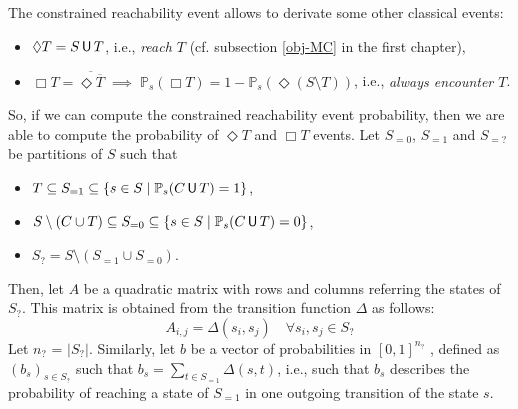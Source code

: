 The constrained reachability event allows to derivate some other classical events:
\begin{itemize}
  \item $\Diamond T = S \,\text{\sffamily U}\, T$, i.e., \textit{reach $T$} (cf. subsection \ref{obj-MC} in the first chapter),
  \item $\Box T =  \overline{\Diamond \overline{T}} \; \implies \; \mathbb{P}_s(\Box T) = 1 - \mathbb{P}_s (\Diamond (S \setminus T))$, i.e., \textit{always encounter $T$}.
\end{itemize}
So, if we can compute the constrained reachability event probability, then we are able to compute the probability of $\Diamond T$ and $\Box T$ events.
Let $S_{=0}$, $S_{=1}$ and $S_{=?}$ be partitions of $S$ such that
\begin{itemize}
  \item $T \subseteq S_{=1} \subseteq \{s \in S \; | \; \mathbb{P}_s(C \,\text{\sffamily U}\, T) = 1\}$,
  \item $S \setminus (C \cup T) \subseteq S_{=0} \subseteq \{ s \in S \; | \; \mathbb{P}_s(C \,\text{\sffamily U}\, T) = 0 \}$,
  \item $S_? = S \setminus (S_{=1} \cup S_{=0})$.
\end{itemize}
Then, let $A$ be a quadratic matrix with rows and columns referring the states of $S_?$. This matrix is obtained from the transition function $\Delta$ as follows:
\[
  A_{i, j} = \Delta(s_i, s_j) \quad \forall s_i, s_j \in S_?
\]
Let $n_?$ = $|S_?|$. Similarly, let $b$ be a vector of probabilities in $[0, 1]^{n_?}$ , defined as $(b_s)_{s \in S_?}$ such that $b_s = \sum_{t \in S_{=1}} \Delta(s, t)$, i.e., such that $b_s$ describes the probability of reaching a state of $S_{=1}$ in one outgoing transition of the state $s$.

